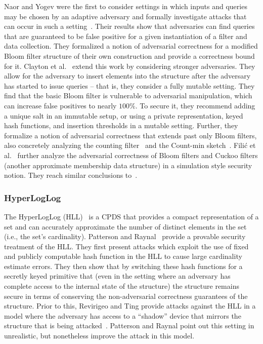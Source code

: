 Naor and Yogev were the first to consider settings in which inputs and queries may be chosen by an adaptive adversary and formally investigate attacks that can occur in such a setting~\cite{naor2015bloom}. Their results show that adversaries can find queries that are guaranteed to be false positive for a given instantiation of a filter and data collection. They formalized a notion of adversarial correctness for a modified Bloom filter structure of their own construction and provide a correctness bound for it.  Clayton et al.~\cite{clayton2019} extend this work by considering stronger adversaries. They allow for the adversary to insert elements into the structure after the adversary has started to issue queries -- that is, they consider a fully mutable setting.  They find that the basic Bloom filter is vulnerable to adversarial manipulation, which can increase false positives to nearly $100\%$. To secure it, they recommend adding a unique salt in an immutable setup, or using a private representation, keyed hash functions, and insertion thresholds in a mutable setting. Further, they formalize a notion of adversarial correctness that extends past only Bloom filters, also concretely analyzing the counting filter~\cite{fan2000summary} and the Count-min sketch~\cite{cormode2005improved}. Filić et al.~\cite{FPUV22,filic2025deletions} further analyze the adversarial correctness of Bloom filters and Cuckoo filters (another approximate membership data structure) in a simulation style security notion. They reach similar conclusions to~\cite{clayton2019}. 

\subsubsection{HyperLogLog}

The HyperLogLog (HLL)~\cite{flajolet2007hyperloglog} is a CPDS that provides a compact representation of a set and can accurately approximate the number of distinct elements in the set (i.e., the set's cardinality). Patterson and Raynal~\cite{PatersonR22} provide a provable security treatment of the HLL. They first present attacks which exploit the use of fixed and publicly computable hash function in the HLL to cause large cardinality estimate errors. They then show that by switching these hash functions for a secretly keyed primitive that (even in the setting where an adversary has complete access to the internal state of the structure) the structure remains secure in terms of conserving the non-adversarial correctness guarantees of the structure. Prior to this, Revirigeo and Ting provide attacks against the HLL in a model where the adversary has access to a ``shadow'' device that mirrors the structure that is being attacked~\cite{reviriego2020security}. Patterson and Raynal point out this setting in unrealistic, but nonetheless improve the attack in this model. 


